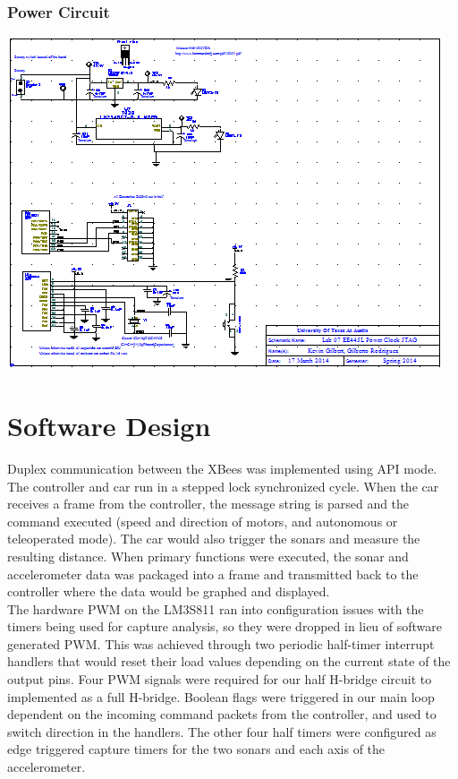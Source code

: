 \documentclass[twoside]{article}
\begin{document}
		\subsubsection{Power Circuit}
			\includegraphics[width=\textwidth]{powerCircuit}

            
\section{Software Design}
Duplex communication between the XBees was implemented using API mode. The controller and car run in a stepped lock synchronized cycle. When the car receives a frame from the controller, the message string is parsed and the command executed (speed and direction of motors, and autonomous or teleoperated mode). The car would also trigger the sonars and measure the resulting distance. When primary functions were executed, the sonar and accelerometer data was packaged into a frame and transmitted back to the controller where the data would be graphed and displayed. \\ 

The hardware PWM on the LM3S811 ran into configuration issues with the timers being used for capture analysis, so they were dropped in lieu of software generated PWM. This was achieved through two periodic half-timer interrupt handlers that would reset their load values depending on the current state of the output pins. Four PWM signals were required for our half H-bridge circuit to implemented as a full H-bridge. Boolean flags were triggered in our main loop dependent on the incoming command packets from the controller, and used to switch direction in the handlers. The other four half timers were configured as edge triggered capture timers for the two sonars and each axis of the accelerometer. \\ 
\end{document}
